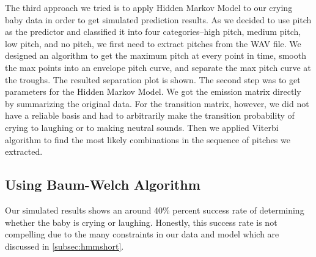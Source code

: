 \documentclass[paper=a4, fontsize=11pt]{scrartcl}
\numberwithin{equation}{section}
\numberwithin{figure}{section}
\numberwithin{table}{section}
\begin{document}
The third approach we tried is to apply Hidden Markov Model to our crying baby data in order to get simulated prediction results. As we decided to use pitch as the predictor and classified it into four categories--high pitch, medium pitch, low pitch, and no pitch, we first need to extract pitches from the WAV file. We designed an algorithm to get the maximum pitch at every point in time, smooth the max points into an envelope pitch curve, and separate the max pitch curve at the troughs. The resulted separation plot is shown. The second step was to get parameters for the Hidden Markov Model. We got the emission matrix directly by summarizing the original data. For the transition matrix, however, we did not have a reliable basis and had to arbitrarily make the transition probability of crying to laughing or to making neutral sounds. Then we applied Viterbi algorithm to find the most likely combinations in the sequence of pitches we extracted.

\subsection{Using Baum-Welch Algorithm}

Our simulated results shows an around 40\% percent success rate of determining whether the baby is crying or laughing. Honestly, this success rate is not compelling due to the many constraints in our data and model which are discussed in \ref{subsec:hmmshort}.

\end{document}
